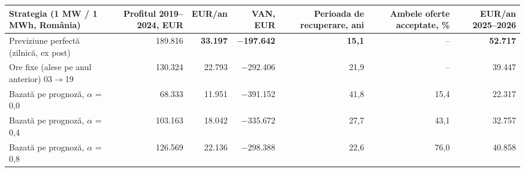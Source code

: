 \begin{tabular}{lrrrrrr}
\toprule
Strategia (1 MW / 1 MWh, România) & Profitul 2019--2024, EUR & EUR/an & VAN, EUR & Perioada de recuperare, ani & Ambele oferte acceptate, \% & EUR/an 2025--2026 \\
\midrule
Previziune perfectă (zilnică, ex post) & 189.816 & \textbf{33.197} & \textbf{$-$197.642} & \textbf{15,1} & -- & \textbf{52.717} \\
Ore fixe (alese pe anul anterior) 03$\rightarrow$19 & 130.324 & 22.793 & $-$292.406 & 21,9 & -- & 39.447 \\
Bazată pe prognoză, $\alpha$ = 0,0 & 68.333 & 11.951 & $-$391.152 & 41,8 & 15,4 & 22.317 \\
Bazată pe prognoză, $\alpha$ = 0,4 & 103.163 & 18.042 & $-$335.672 & 27,7 & 43,1 & 32.757 \\
Bazată pe prognoză, $\alpha$ = 0,8 & 126.569 & 22.136 & $-$298.388 & 22,6 & 76,0 & 40.858 \\
\bottomrule
\end{tabular}
